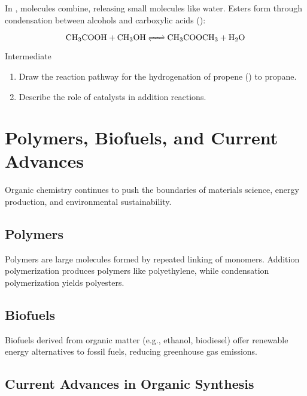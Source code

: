 In , molecules combine, releasing small molecules like water. Esters form through condensation between alcohols and carboxylic acids ():

\[
\ce{CH3COOH + CH3OH <=> CH3COOCH3 + H2O}
\]


\begin{tieredquestions}{Intermediate}
\begin{enumerate}
    \item Draw the reaction pathway for the hydrogenation of propene () to propane.
    \item Describe the role of catalysts in addition reactions.
\end{enumerate}
\end{tieredquestions}

\FloatBarrier

\section{Polymers, Biofuels, and Current Advances}
\FloatBarrier
\FloatBarrier
\FloatBarrier

Organic chemistry continues to push the boundaries of materials science, energy production, and environmental sustainability.

\subsection{Polymers}
\FloatBarrier
\FloatBarrier
\FloatBarrier

Polymers are large molecules formed by repeated linking of monomers. Addition polymerization produces polymers like polyethylene, while condensation polymerization yields polyesters.

\subsection{Biofuels}
\FloatBarrier
\FloatBarrier
\FloatBarrier

Biofuels derived from organic matter (e.g., ethanol, biodiesel) offer renewable energy alternatives to fossil fuels, reducing greenhouse gas emissions.

\subsection{Current Advances in Organic Synthesis}
\FloatBarrier
\FloatBarrier
\FloatBarrier

